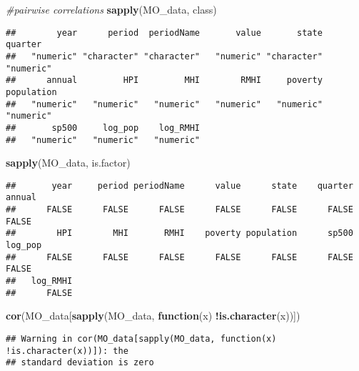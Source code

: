\documentclass[
]{article}
\newenvironment{Shaded}{\begin{snugshade}}{\end{snugshade}}
\newcommand{\CommentTok}[1]{\textcolor[rgb]{0.56,0.35,0.01}{\textit{#1}}}
\newcommand{\ControlFlowTok}[1]{\textcolor[rgb]{0.13,0.29,0.53}{\textbf{#1}}}
\newcommand{\KeywordTok}[1]{\textcolor[rgb]{0.13,0.29,0.53}{\textbf{#1}}}
\newcommand{\NormalTok}[1]{#1}
\newcommand{\OperatorTok}[1]{\textcolor[rgb]{0.81,0.36,0.00}{\textbf{#1}}}
\begin{document}
\begin{Shaded}
\begin{Highlighting}[]
\CommentTok{#pairwise correlations}
\KeywordTok{sapply}\NormalTok{(MO_data, class)}
\end{Highlighting}
\end{Shaded}

\begin{verbatim}
##        year      period  periodName       value       state     quarter 
##   "numeric" "character" "character"   "numeric" "character"   "numeric" 
##      annual         HPI         MHI        RMHI     poverty  population 
##   "numeric"   "numeric"   "numeric"   "numeric"   "numeric"   "numeric" 
##       sp500     log_pop    log_RMHI 
##   "numeric"   "numeric"   "numeric"
\end{verbatim}

\begin{Shaded}
\begin{Highlighting}[]
\KeywordTok{sapply}\NormalTok{(MO_data, is.factor)}
\end{Highlighting}
\end{Shaded}

\begin{verbatim}
##       year     period periodName      value      state    quarter     annual 
##      FALSE      FALSE      FALSE      FALSE      FALSE      FALSE      FALSE 
##        HPI        MHI       RMHI    poverty population      sp500    log_pop 
##      FALSE      FALSE      FALSE      FALSE      FALSE      FALSE      FALSE 
##   log_RMHI 
##      FALSE
\end{verbatim}

\begin{Shaded}
\begin{Highlighting}[]
\KeywordTok{cor}\NormalTok{(MO_data[}\KeywordTok{sapply}\NormalTok{(MO_data, }\ControlFlowTok{function}\NormalTok{(x) }\OperatorTok{!}\KeywordTok{is.character}\NormalTok{(x))])}
\end{Highlighting}
\end{Shaded}

\begin{verbatim}
## Warning in cor(MO_data[sapply(MO_data, function(x) !is.character(x))]): the
## standard deviation is zero
\end{verbatim}
\end{document}
